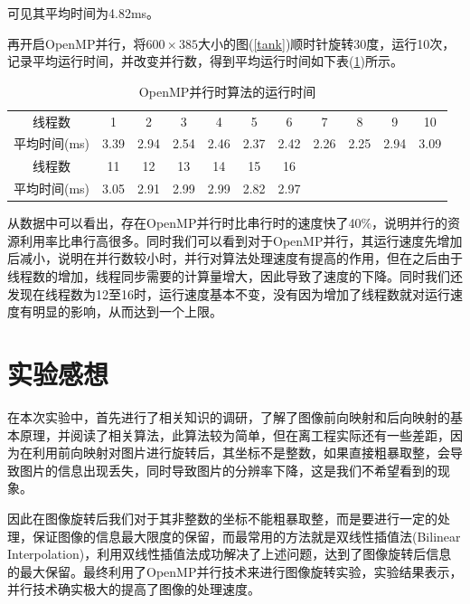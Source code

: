 \documentclass[UTF-8, a4paper, 12pt]{ctexart}
\begin{document}
可见其平均时间为4.82ms。

再开启OpenMP并行，将$600\times 385$大小的图(\ref{tank})顺时针旋转30度，运行10次，记录平均运行时间，并改变并行数，得到平均运行时间如下表(\ref{tq})所示。
\begin{table}[htbp]
    \centering
    \caption{OpenMP并行时算法的运行时间}
    \label{tq}
    \begin{tabular}{c|cccccccccc}
        \hline
        线程数&1&2&3&4&5&6&7&8&9&10\\
        平均时间(ms)&3.39&2.94&2.54&2.46&2.37&2.42&2.26&2.25&2.94&3.09\\
        \hline
        线程数&11&12&13&14&15&16&&&&\\
        平均时间(ms)&3.05&2.91&2.99&2.99&2.82&2.97&&&&\\
        \hline
    \end{tabular}
\end{table}

从数据中可以看出，存在OpenMP并行时比串行时的速度快了40\%，说明并行的资源利用率比串行高很多。同时我们可以看到对于OpenMP并行，其运行速度先增加后减小，说明在并行数较小时，并行对算法处理速度有提高的作用，但在之后由于线程数的增加，线程同步需要的计算量增大，因此导致了速度的下降。同时我们还发现在线程数为12至16时，运行速度基本不变，没有因为增加了线程数就对运行速度有明显的影响，从而达到一个上限。
\section{实验感想}

在本次实验中，首先进行了相关知识的调研，了解了图像前向映射和后向映射的基本原理，并阅读了相关算法，此算法较为简单，但在离工程实际还有一些差距，因为在利用前向映射对图片进行旋转后，其坐标不是整数，如果直接粗暴取整，会导致图片的信息出现丢失，同时导致图片的分辨率下降，这是我们不希望看到的现象。

因此在图像旋转后我们对于其非整数的坐标不能粗暴取整，而是要进行一定的处理，保证图像的信息最大限度的保留，而最常用的方法就是双线性插值法(Bilinear Interpolation)，利用双线性插值法成功解决了上述问题，达到了图像旋转后信息的最大保留。最终利用了OpenMP并行技术来进行图像旋转实验，实验结果表示，并行技术确实极大的提高了图像的处理速度。
\end{document}
